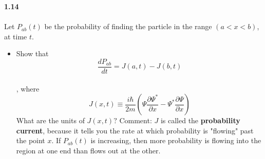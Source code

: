 \documentclass[fleqn]{article}
\begin{document}
  \textbf{1.14} \\ \\
  Let $P_{ab}(t)$ be the probability of finding the particle in the range $(a<x<b)$, at time $t$.
  \begin{itemize}
    \item Show that $$\dfrac{dP_{ab}}{dt}=J(a,t)-J(b,t)$$ \\
    , where \\
    $$J(x,t)\equiv \dfrac{i \hbar}{2m} \left(\Psi \dfrac{\partial \Psi^*}{\partial x}-\Psi^* \dfrac{\partial \Psi}{\partial x}\right)$$
    What are the units of $J(x,t)?$ Comment: $J$ is called the \textbf{probability current}, because it tells you the rate at which 
    probability is "flowing" past the point $x$. If $P_{ab}(t)$ is increasing, then more probability is flowing into the region
    at one end than flows out at the other.



\end{itemize}
\end{document}
